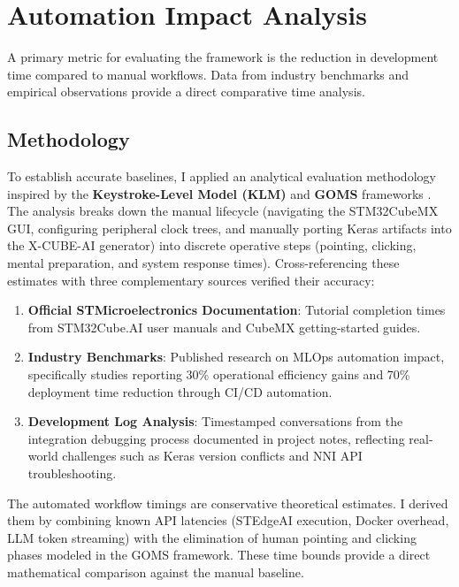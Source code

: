 \section{Automation Impact Analysis}
\label{sec:productivity}

A primary metric for evaluating the framework is the reduction in development time compared to manual workflows. Data from industry benchmarks and empirical observations provide a direct comparative time analysis.

\subsection{Methodology}

To establish accurate baselines, I applied an analytical evaluation methodology inspired by the \textbf{Keystroke-Level Model (KLM)} and \textbf{GOMS} frameworks \cite{card1980keystroke, baek2014evaluating}. The analysis breaks down the manual lifecycle (navigating the STM32CubeMX GUI, configuring peripheral clock trees, and manually porting Keras artifacts into the X-CUBE-AI generator) into discrete operative steps (pointing, clicking, mental preparation, and system response times). Cross-referencing these estimates with three complementary sources verified their accuracy:

\begin{enumerate}
    \item \textbf{Official STMicroelectronics Documentation}: Tutorial completion times from STM32Cube.AI user manuals and CubeMX getting-started guides\cite{st_cubemx_manual}.
    \item \textbf{Industry Benchmarks}: Published research on MLOps automation impact, specifically studies reporting 30\% operational efficiency gains and 70\% deployment time reduction through CI/CD automation\cite{mlops_productivity_2024, embedded_ml_cicd_2025}.
    \item \textbf{Development Log Analysis}: Timestamped conversations from the integration debugging process documented in project notes, reflecting real-world challenges such as Keras version conflicts and NNI API troubleshooting.
\end{enumerate}

The automated workflow timings are conservative theoretical estimates. I derived them by combining known API latencies (STEdgeAI execution, Docker overhead, LLM token streaming) with the elimination of human pointing and clicking phases modeled in the GOMS framework. These time bounds provide a direct mathematical comparison against the manual baseline.

